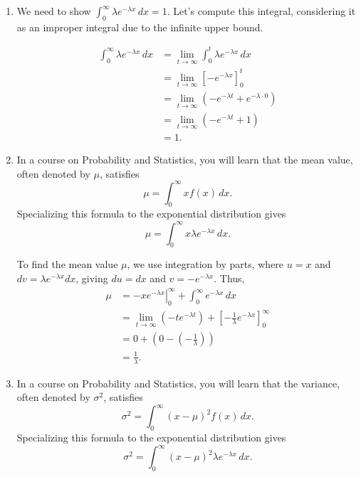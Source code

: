\begin{enumerate}
\renewcommand{\labelenumi}{(\alph{enumi})}
\setlength{\itemsep}{.2cm}
    \item We need to show $\displaystyle \int_0^\infty \lambda e^{-\lambda x} \, dx = 1$. 
Let's compute this integral, considering it as an improper integral due to the infinite upper bound.

\[
\begin{aligned}
\int_0^\infty \lambda e^{-\lambda x} \, dx &= \lim_{t \to \infty} \int_0^t \lambda e^{-\lambda x} \, dx \\
&= \lim_{t \to \infty} \left[-e^{-\lambda x}\right]_0^t \\
&= \lim_{t \to \infty} \left(-e^{-\lambda t} + e^{-\lambda \cdot 0}\right) \\
&= \lim_{t \to \infty} \left(-e^{-\lambda t} + 1\right) \\
&= 1.
\end{aligned}
\]
    \item In a course on Probability and Statistics, you will learn that the mean value, often denoted by $\mu$, satisfies
\[ \mu = \int_0^\infty x f(x) \, dx. \]
Specializing this formula to the exponential distribution gives
\[ \mu = \int_0^\infty x \lambda e^{-\lambda x} \, dx. \]

To find the mean value $\mu$, we use integration by parts, where $u = x$ and $dv = \lambda e^{-\lambda x} dx$, giving $du = dx$ and $v = -e^{-\lambda x}$. Thus,
\[
\begin{aligned}
\mu &= \left. -xe^{-\lambda x} \right|_0^\infty + \int_0^\infty e^{-\lambda x} \, dx \\
&= \lim_{t \to \infty} \left( -te^{-\lambda t} \right) + \left[ -\frac{1}{\lambda}e^{-\lambda x} \right]_0^\infty \\
&= 0 + \left( 0 - \left(-\frac{1}{\lambda}\right) \right) \\
&= \frac{1}{\lambda}.
\end{aligned}
\]

    \item In a course on Probability and Statistics, you will learn that the variance, often denoted by $\sigma^2$, satisfies 
     \[ \sigma^2 = \int_0^\infty (x - \mu)^2 f(x) \, dx. \]
Specializing this formula to the exponential distribution gives    
    \[ \sigma^2 = \int_0^\infty (x - \mu)^2 \lambda e^{-\lambda x} \, dx. \]


\end{enumerate}
